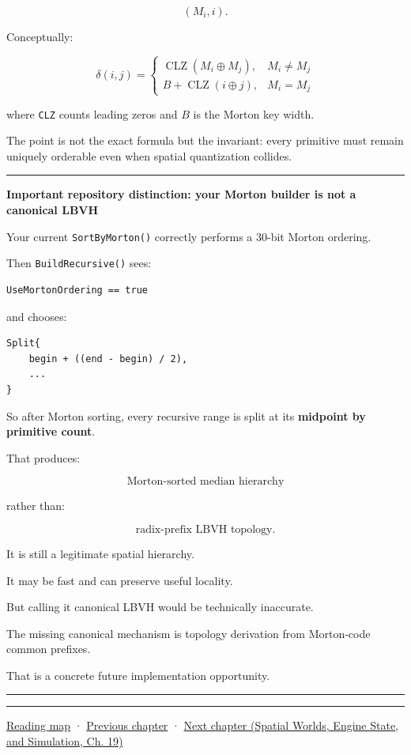 \[
(M_i,i).
\]

Conceptually:

\[
\delta(i,j)
=
\begin{cases}
\operatorname{CLZ}(M_i\oplus M_j), & M_i\ne M_j\\
B+\operatorname{CLZ}(i\oplus j), & M_i=M_j
\end{cases}
\]

where \texttt{CLZ} counts leading zeros and \(B\) is the Morton key width.

The point is not the exact formula but the invariant: every primitive must remain uniquely orderable even when spatial quantization collides.

\begin{center}\rule{0.5\linewidth}{0.5pt}\end{center}

\textbf{Important repository distinction: your Morton builder is not a canonical LBVH}

Your current \texttt{SortByMorton()} correctly performs a 30-bit Morton ordering.

Then \texttt{BuildRecursive()} sees:

\begin{verbatim}
UseMortonOrdering == true
\end{verbatim}

and chooses:

\begin{verbatim}
Split{
    begin + ((end - begin) / 2),
    ...
}
\end{verbatim}

So after Morton sorting, every recursive range is split at its \textbf{midpoint by primitive count}.

That produces:

\[
\boxed{\text{Morton-sorted median hierarchy}}
\]

rather than:

\[
\boxed{\text{radix-prefix LBVH topology}}.
\]

It is still a legitimate spatial hierarchy.

It may be fast and can preserve useful locality.

But calling it canonical LBVH would be technically inaccurate.

The missing canonical mechanism is topology derivation from Morton-code common prefixes.

That is a concrete future implementation opportunity.

\begin{center}\rule{0.5\linewidth}{0.5pt}\end{center}

\begin{center}\rule{0.5\linewidth}{0.5pt}\end{center}

\hyperref[volume-reading-map]{Reading map} · \hyperref[06-engine-ii-ch026-descriptor-arrays-and-backend-limits]{Previous chapter} · \href{../05-Spatial-Worlds-Engine-State-and-Simulation/main.pdf\#nameddest=06-engine-ii-ch028-bvh-traversal-refitting-and-simd}{Next chapter (Spatial Worlds, Engine State, and Simulation, Ch. 19)}
